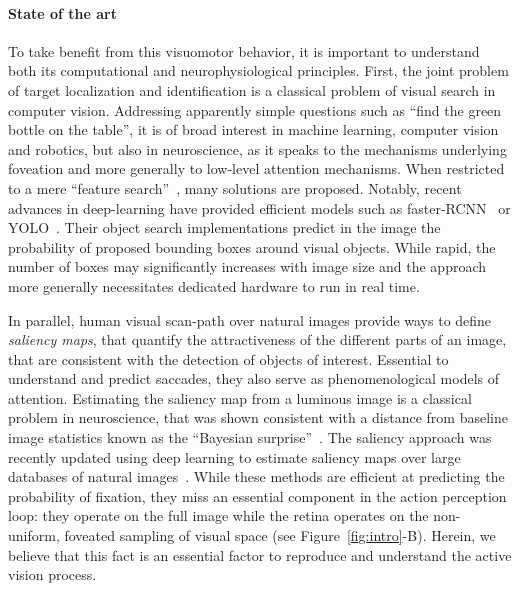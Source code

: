 %
\paragraph{State of the art}

To take benefit from this visuomotor behavior, it is important to understand both its computational and neurophysiological principles. First, the joint problem of target localization and identification is a classical problem of visual search in computer vision. Addressing apparently simple questions such as ``find the green bottle on the table'', it is of broad interest in machine learning, computer vision and robotics, but also in neuroscience, as it speaks to the mechanisms underlying foveation and more generally to low-level attention mechanisms.
When restricted to a mere ``feature search''~\citep{Treisman80}, many solutions are proposed. Notably, recent advances in deep-learning have provided efficient models such as faster-RCNN~\citep{Ren17} or YOLO~\citep{Redmon15}. 
Their object search implementations predict in the image the probability of proposed bounding boxes around visual objects. While rapid, the number of boxes may significantly increases with image size and the approach more generally necessitates dedicated hardware to run in real time. 

In parallel, human visual scan-path over natural images provide ways to define \emph{saliency maps}, that quantify the attractiveness of the different parts of an image, that are consistent with the detection of objects of interest. Essential to understand and predict saccades, they also serve as phenomenological models of attention. Estimating the saliency map from  a luminous image is a classical problem in neuroscience, that was shown consistent with a distance from baseline image statistics known as the ``Bayesian surprise''~\citep{Itti01}. The saliency approach was recently updated using deep learning to estimate saliency maps over large databases of natural images~\citep{Kummerer16}. 
While these methods are efficient at predicting the probability of fixation, they miss an essential component in the action perception loop: they operate on the full image while the retina operates on the non-uniform, foveated sampling of visual space (see Figure~\ref{fig:intro}-B). 
Herein, we believe that this fact is an essential factor to reproduce and understand the active vision process.

